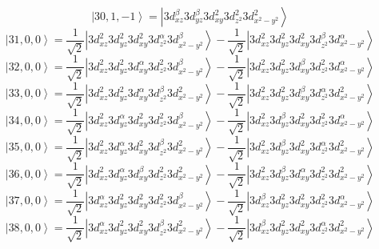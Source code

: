 \documentclass[11pt]{article}
\begin{document}
\begin{equation*}
\left|30,1,-1\right>=\left|3d_{xz}^{\beta}3d_{yz}^{\beta}3d_{xy}^{2}3d_{z^2}^{2}3d_{x^2-y^2}^{2}\right>\end{equation*}
\begin{equation*}
\left|31,0,0\right>=\frac{1}{\sqrt{2}}\left|3d_{xz}^{2}3d_{yz}^{2}3d_{xy}^{2}3d_{z^2}^{\alpha}3d_{x^2-y^2}^{\beta}\right>-\frac{1}{\sqrt{2}}\left|3d_{xz}^{2}3d_{yz}^{2}3d_{xy}^{2}3d_{z^2}^{\beta}3d_{x^2-y^2}^{\alpha}\right>\end{equation*}
\begin{equation*}
\left|32,0,0\right>=\frac{1}{\sqrt{2}}\left|3d_{xz}^{2}3d_{yz}^{2}3d_{xy}^{\alpha}3d_{z^2}^{2}3d_{x^2-y^2}^{\beta}\right>-\frac{1}{\sqrt{2}}\left|3d_{xz}^{2}3d_{yz}^{2}3d_{xy}^{\beta}3d_{z^2}^{2}3d_{x^2-y^2}^{\alpha}\right>\end{equation*}
\begin{equation*}
\left|33,0,0\right>=\frac{1}{\sqrt{2}}\left|3d_{xz}^{2}3d_{yz}^{2}3d_{xy}^{\alpha}3d_{z^2}^{\beta}3d_{x^2-y^2}^{2}\right>-\frac{1}{\sqrt{2}}\left|3d_{xz}^{2}3d_{yz}^{2}3d_{xy}^{\beta}3d_{z^2}^{\alpha}3d_{x^2-y^2}^{2}\right>\end{equation*}
\begin{equation*}
\left|34,0,0\right>=\frac{1}{\sqrt{2}}\left|3d_{xz}^{2}3d_{yz}^{\alpha}3d_{xy}^{2}3d_{z^2}^{2}3d_{x^2-y^2}^{\beta}\right>-\frac{1}{\sqrt{2}}\left|3d_{xz}^{2}3d_{yz}^{\beta}3d_{xy}^{2}3d_{z^2}^{2}3d_{x^2-y^2}^{\alpha}\right>\end{equation*}
\begin{equation*}
\left|35,0,0\right>=\frac{1}{\sqrt{2}}\left|3d_{xz}^{2}3d_{yz}^{\alpha}3d_{xy}^{2}3d_{z^2}^{\beta}3d_{x^2-y^2}^{2}\right>-\frac{1}{\sqrt{2}}\left|3d_{xz}^{2}3d_{yz}^{\beta}3d_{xy}^{2}3d_{z^2}^{\alpha}3d_{x^2-y^2}^{2}\right>\end{equation*}
\begin{equation*}
\left|36,0,0\right>=\frac{1}{\sqrt{2}}\left|3d_{xz}^{2}3d_{yz}^{\alpha}3d_{xy}^{\beta}3d_{z^2}^{2}3d_{x^2-y^2}^{2}\right>-\frac{1}{\sqrt{2}}\left|3d_{xz}^{2}3d_{yz}^{\beta}3d_{xy}^{\alpha}3d_{z^2}^{2}3d_{x^2-y^2}^{2}\right>\end{equation*}
\begin{equation*}
\left|37,0,0\right>=\frac{1}{\sqrt{2}}\left|3d_{xz}^{\alpha}3d_{yz}^{2}3d_{xy}^{2}3d_{z^2}^{2}3d_{x^2-y^2}^{\beta}\right>-\frac{1}{\sqrt{2}}\left|3d_{xz}^{\beta}3d_{yz}^{2}3d_{xy}^{2}3d_{z^2}^{2}3d_{x^2-y^2}^{\alpha}\right>\end{equation*}
\begin{equation*}
\left|38,0,0\right>=\frac{1}{\sqrt{2}}\left|3d_{xz}^{\alpha}3d_{yz}^{2}3d_{xy}^{2}3d_{z^2}^{\beta}3d_{x^2-y^2}^{2}\right>-\frac{1}{\sqrt{2}}\left|3d_{xz}^{\beta}3d_{yz}^{2}3d_{xy}^{2}3d_{z^2}^{\alpha}3d_{x^2-y^2}^{2}\right>\end{equation*}
\end{document}
